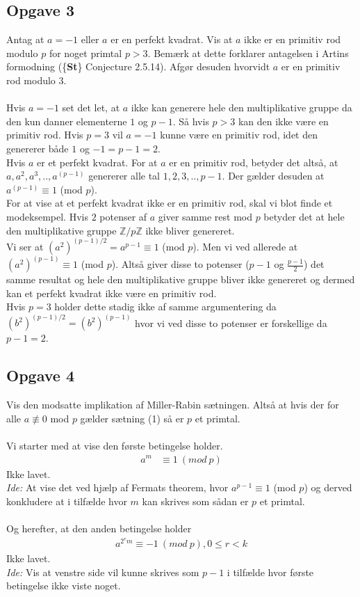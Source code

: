 \documentclass[12pt]{article}
\begin{document}
\subsection*{Opgave 3}
Antag at $a=-1$ eller $a$ er en perfekt kvadrat. Vis at $a$ ikke er en primitiv rod modulo $p$ for noget primtal $p >3$. Bemærk at dette forklarer antagelsen i Artins formodning (\{\textbf{St}\} Conjecture 2.5.14). Afgør desuden hvorvidt $a$ er en primitiv rod modulo $3$.\\
\\
Hvis $a=-1$ set det let, at $a$ ikke kan generere hele den multiplikative gruppe da den kun danner elementerne $1$ og $p-1$. Så hvis $p>3$ kan den ikke være en primitiv rod. Hvis $p=3$ vil $a=-1$ kunne være en primitiv rod, idet den genererer både $1$ og $-1=p-1=2$.\\
Hvis $a$ er et perfekt kvadrat. For at $a$ er en primitiv rod, betyder det altså, at $a,a^2,a^3,..,a^{(p-1)}$ genererer alle tal $1,2,3,..,p-1$. Der gælder desuden at $a^{(p-1)} \equiv 1$ (mod $p$). \\
For at vise at et perfekt kvadrat ikke er en primitiv rod, skal vi blot finde et modeksempel. Hvis $2$ potenser af $a$ giver samme rest mod $p$ betyder det at hele den multiplikative gruppe $\mathbb{Z}/p\mathbb{Z}$ ikke bliver genereret.\\
Vi ser at $(a^2)^{(p-1)/2}=a^{p-1}\equiv 1$ (mod $p$). Men vi ved allerede at $(a^2)^{(p-1)}\equiv 1$ (mod $p$). Altså giver disse to potenser ($p-1$ og $\frac{p-1}{2}$) det samme resultat og hele den multiplikative gruppe bliver ikke genereret og dermed kan et perfekt kvadrat ikke være en primitiv rod.\\
Hvis $p=3$ holder dette stadig ikke af samme argumentering da $(b^2)^{(p-1)/2}=(b^2)^{(p-1)}$ hvor vi ved disse to potenser er forskellige da $p-1=2$.

\subsection*{Opgave 4}
Vis den modsatte implikation af Miller-Rabin sætningen. Altså at hvis der for alle
$a \not\equiv 0$ mod $p$ gælder sætning (1) så er $p$ et primtal.\\
\\
Vi starter med at vise den første betingelse holder.
\begin{align*}
a^m &\equiv 1\:(mod\:p)
\end{align*}
Ikke lavet. \\
\textit{Ide:} At vise det ved hjælp af Fermats theorem, hvor $a^{p-1}\equiv 1$ (mod $p$) og derved konkludere at i tilfælde hvor $m$ kan skrives som sådan er $p$ et primtal.\\
\\
Og herefter, at den anden betingelse holder
\begin{align*}
a^{2^rm}\equiv -1\:(mod\:p), 0\leq r < k
\end{align*}
Ikke lavet. \\
\textit{Ide:} Vis at venstre side vil kunne skrives som $p-1$ i tilfælde hvor første betingelse ikke viste noget.
\end{document}

